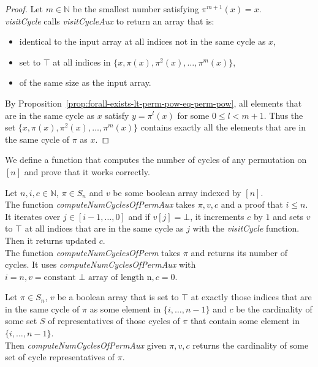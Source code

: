 \begin{proof}
  \leanok
  Let $m \in \mathbb{N}$ be the smallest number satisfying $\pi^{m + 1}(x) = x$.\\
  \emph{visitCycle} calls \emph{visitCycleAux} to return an array that is:
  \begin{itemize}
    \item identical to the input array at all indices not in the same cycle as $x$,
    \item set to $\top$ at all indices in $\{x, \pi(x), \pi^2(x), \dots, \pi^m(x)\}$,
    \item of the same size as the input array.
  \end{itemize}
  By Proposition~\ref{prop:forall-exists-lt-perm-pow-eq-perm-pow}, all elements that are in the same cycle as $x$ satisfy $y = \pi^l(x)$ for some $0 \leq l < m + 1$. Thus the set $\{x, \pi(x), \pi^2(x), \dots, \pi^m(x)\}$ contains exactly all the elements that are in the same cycle of $\pi$ as $x$.
\end{proof}

We define a function that computes the number of cycles of any permutation on $[n]$ and prove that it works correctly.

\begin{definition}
  \label{def:computeNumCyclesOfPerm}
  \leanok
  Let $n, i, c \in \mathbb{N}$, $\pi \in S_n$ and $v$ be some boolean array indexed by $[n]$.\\
  The function \emph{computeNumCyclesOfPermAux} takes $\pi, v, c$ and a proof that $i \leq n$. It iterates over $j \in [i - 1, \dots, 0]$ and if $v[j] = \bot$, it increments $c$ by $1$ and sets $v$ to $\top$ at all indices that are in the same cycle as $j$ with the \emph{visitCycle} function. Then it returns updated $c$.\\
  The function \emph{computeNumCyclesOfPerm} takes $\pi$ and returns its number of cycles. It uses \emph{computeNumCyclesOfPermAux} with $i = n, v = \text{constant }\bot\text{ array of length n}, c = 0$.
\end{definition}

\begin{proposition}
  \label{prop:computeNumCyclesOfPermAux-exists-representatives}
  \leanok
  Let $\pi \in S_n$, $v$ be a boolean array that is set to $\top$ at exactly those indices that are in the same cycle of $\pi$ as some element in $\{i, \dots, n - 1\}$ and $c$ be the cardinality of some set $S$ of representatives of those cycles of $\pi$ that contain some element in $\{i, \dots, n - 1\}$.\\
  Then \emph{computeNumCyclesOfPermAux} given $\pi, v, c$ returns the cardinality of some set of cycle representatives of $\pi$.
\end{proposition}

